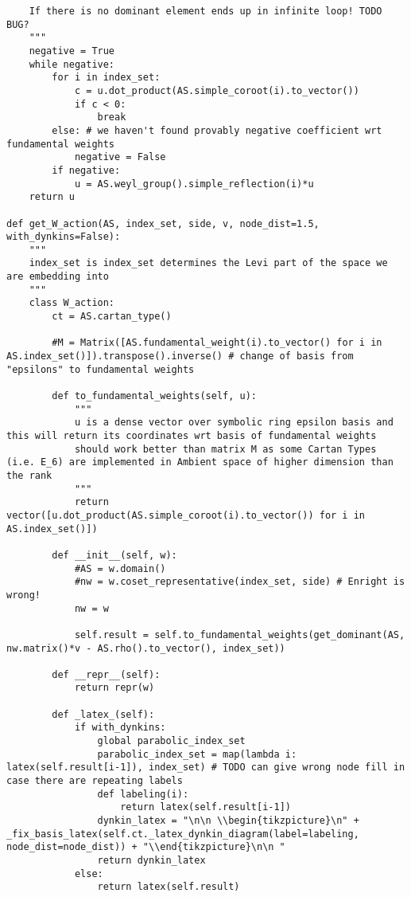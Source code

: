 \begin{verbatim}
    If there is no dominant element ends up in infinite loop! TODO BUG?
    """
    negative = True
    while negative:
        for i in index_set:
            c = u.dot_product(AS.simple_coroot(i).to_vector())
            if c < 0:
                break
        else: # we haven't found provably negative coefficient wrt fundamental weights
            negative = False
        if negative:
            u = AS.weyl_group().simple_reflection(i)*u
    return u

def get_W_action(AS, index_set, side, v, node_dist=1.5, with_dynkins=False):
    """
    index_set is index_set determines the Levi part of the space we are embedding into
    """
    class W_action:
        ct = AS.cartan_type()

        #M = Matrix([AS.fundamental_weight(i).to_vector() for i in AS.index_set()]).transpose().inverse() # change of basis from "epsilons" to fundamental weights

        def to_fundamental_weights(self, u):
            """
            u is a dense vector over symbolic ring epsilon basis and this will return its coordinates wrt basis of fundamental weights
            should work better than matrix M as some Cartan Types (i.e. E_6) are implemented in Ambient space of higher dimension than the rank
            """
            return vector([u.dot_product(AS.simple_coroot(i).to_vector()) for i in AS.index_set()])

        def __init__(self, w):
            #AS = w.domain()
            #nw = w.coset_representative(index_set, side) # Enright is wrong!
            nw = w

            self.result = self.to_fundamental_weights(get_dominant(AS, nw.matrix()*v - AS.rho().to_vector(), index_set))

        def __repr__(self):
            return repr(w)

        def _latex_(self):
            if with_dynkins:
                global parabolic_index_set
                parabolic_index_set = map(lambda i: latex(self.result[i-1]), index_set) # TODO can give wrong node fill in case there are repeating labels
                def labeling(i):
                    return latex(self.result[i-1])
                dynkin_latex = "\n\n \\begin{tikzpicture}\n" + _fix_basis_latex(self.ct._latex_dynkin_diagram(label=labeling, node_dist=node_dist)) + "\\end{tikzpicture}\n\n "
                return dynkin_latex
            else:
                return latex(self.result)


\end{verbatim}
